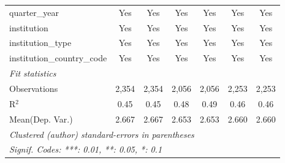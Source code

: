 \begin{tabular}{lcccccc}
   quarter\_year                      & Yes     & Yes      & Yes     & Yes      & Yes     & Yes\\  
   institution                        & Yes     & Yes      & Yes     & Yes      & Yes     & Yes\\  
   institution\_type                  & Yes     & Yes      & Yes     & Yes      & Yes     & Yes\\  
   institution\_country\_code         & Yes     & Yes      & Yes     & Yes      & Yes     & Yes\\  
   \midrule
   \emph{Fit statistics}\\
   Observations                       & 2,354   & 2,354    & 2,056   & 2,056    & 2,253   & 2,253\\  
   R$^2$                              & 0.45    & 0.45     & 0.48    & 0.49     & 0.46    & 0.46\\  
Mean(Dep. Var.) & 2.667 & 2.667 & 2.653 & 2.653 & 2.660 & 2.660 \\
   \midrule \midrule
   \multicolumn{7}{l}{\emph{Clustered (author) standard-errors in parentheses}}\\
   \multicolumn{7}{l}{\emph{Signif. Codes: ***: 0.01, **: 0.05, *: 0.1}}\\
\end{tabular}
\par\endgroup

